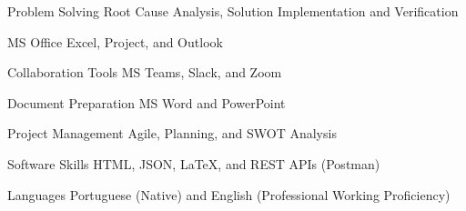 


\begin{cvskills}


\cvskill
{Problem Solving} %
{Root Cause Analysis, Solution Implementation and Verification} %


\cvskill
{MS Office} %
{Excel, Project, and Outlook} %


\cvskill
{Collaboration Tools} %
{MS Teams, Slack, and Zoom} %


\cvskill
{Document Preparation} %
{MS Word and PowerPoint} %


\cvskill
{Project Management} %
{Agile, Planning, and SWOT Analysis} %


\cvskill
{Software Skills} %
{HTML, JSON, LaTeX, and REST APIs (Postman)}


\cvskill
{Languages} %
{ Portuguese (Native) and English (Professional Working Proficiency)} %


\end{cvskills}
